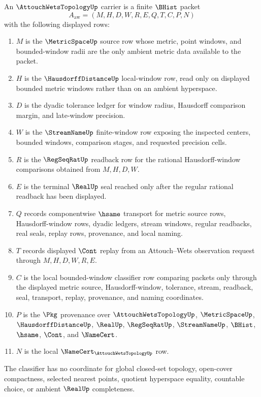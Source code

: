 \begin{definition}
\label{def:attouch-wets-topology-carrier}
An $\AttouchWetsTopologyUp$ carrier is a finite $\BHist$ packet
$$
A_{\mathrm{aw}}=(M,H,D,W,R,E,Q,T,C,P,N)
$$
with the following displayed rows:
\begin{enumerate}
\item $M$ is the $\MetricSpaceUp$ source row whose metric, point windows, and bounded-window radii are the only ambient metric data available to the packet.
\item $H$ is the $\HausdorffDistanceUp$ local-window row, read only on displayed bounded metric windows rather than on an ambient hyperspace.
\item $D$ is the dyadic tolerance ledger for window radius, Hausdorff comparison margin, and late-window precision.
\item $W$ is the $\StreamNameUp$ finite-window row exposing the inspected centers, bounded windows, comparison stages, and requested precision cells.
\item $R$ is the $\RegSeqRatUp$ readback row for the rational Hausdorff-window comparisons obtained from $M,H,D,W$.
\item $E$ is the terminal $\RealUp$ seal reached only after the regular rational readback has been displayed.
\item $Q$ records componentwise $\hsame$ transport for metric source rows, Hausdorff-window rows, dyadic ledgers, stream windows, regular readbacks, real seals, replay rows, provenance, and local naming.
\item $T$ records displayed $\Cont$ replay from an Attouch--Wets observation request through $M,H,D,W,R,E$.
\item $C$ is the local bounded-window classifier row comparing packets only through the displayed metric source, Hausdorff-window, tolerance, stream, readback, seal, transport, replay, provenance, and naming coordinates.
\item $P$ is the $\Pkg$ provenance over $\AttouchWetsTopologyUp$, $\MetricSpaceUp$, $\HausdorffDistanceUp$, $\RealUp$, $\RegSeqRatUp$, $\StreamNameUp$, $\BHist$, $\hsame$, $\Cont$, and $\NameCert$.
\item $N$ is the local $\NameCert_{\AttouchWetsTopologyUp}$ row.
\end{enumerate}
The classifier has no coordinate for global closed-set topology, open-cover compactness, selected nearest points, quotient hyperspace equality, countable choice, or ambient $\RealUp$ completeness.
\end{definition}

